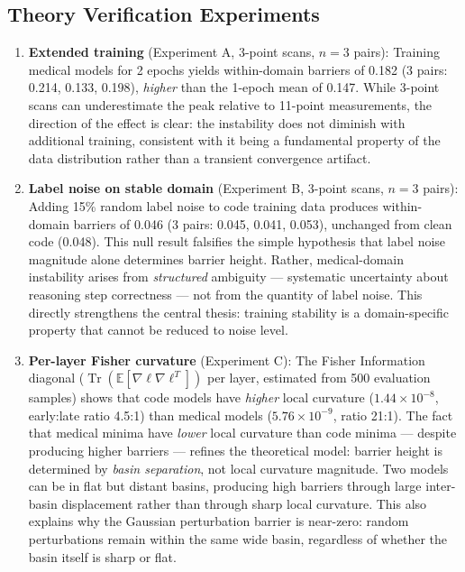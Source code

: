 \documentclass[11pt,a4paper]{article}
\begin{document}
\subsection{Theory Verification Experiments}

\begin{enumerate}
\item \textbf{Extended training} (Experiment A, 3-point scans, $n=3$ pairs): Training medical models for 2 epochs yields within-domain barriers of 0.182 (3 pairs: 0.214, 0.133, 0.198), \emph{higher} than the 1-epoch mean of 0.147. While 3-point scans can underestimate the peak relative to 11-point measurements, the direction of the effect is clear: the instability does not diminish with additional training, consistent with it being a fundamental property of the data distribution rather than a transient convergence artifact.
\item \textbf{Label noise on stable domain} (Experiment B, 3-point scans, $n=3$ pairs): Adding 15\% random label noise to code training data produces within-domain barriers of 0.046 (3 pairs: 0.045, 0.041, 0.053), unchanged from clean code (0.048). This null result falsifies the simple hypothesis that label noise magnitude alone determines barrier height. Rather, medical-domain instability arises from \emph{structured} ambiguity — systematic uncertainty about reasoning step correctness — not from the quantity of label noise. This directly strengthens the central thesis: training stability is a domain-specific property that cannot be reduced to noise level.
\item \textbf{Per-layer Fisher curvature} (Experiment C): The Fisher Information diagonal ($\operatorname{Tr}(\mathbb{E}[\nabla\ell \nabla\ell^T])$ per layer, estimated from 500 evaluation samples) shows that code models have \emph{higher} local curvature ($1.44 \times 10^{-8}$, early:late ratio 4.5:1) than medical models ($5.76 \times 10^{-9}$, ratio 21:1). The fact that medical minima have \emph{lower} local curvature than code minima — despite producing higher barriers — refines the theoretical model: barrier height is determined by \emph{basin separation}, not local curvature magnitude. Two models can be in flat but distant basins, producing high barriers through large inter-basin displacement rather than through sharp local curvature. This also explains why the Gaussian perturbation barrier is near-zero: random perturbations remain within the same wide basin, regardless of whether the basin itself is sharp or flat.
\end{enumerate}
\end{document}
